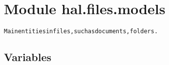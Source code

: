 %
%
%


\section{Module hal.files.models}

    \label{hal:files:models}
\begin{alltt}
Main entities in files, such as documents, folders. 
\end{alltt}



  \subsection{Variables}

